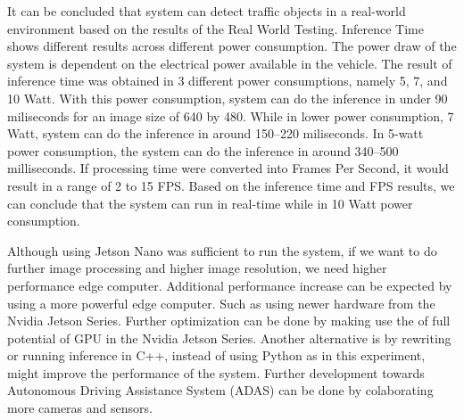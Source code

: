\documentclass[conference]{IEEEtran}
\begin{document}
It can be concluded that system can detect traffic objects in a real-world environment based on the results of the Real World Testing. Inference Time shows different results across different power consumption.
The power draw of the system is dependent on the electrical power available in the vehicle. The result of inference time was obtained in 3 different power consumptions, namely 5, 7, and 10 Watt.
With this power consumption, system can do the inference in under 90 miliseconds for an image size of 640 by 480.
While in lower power consumption, 7 Watt, system can do the inference in around 150--220 miliseconds.
In 5-watt power consumption, the system can do the inference in around 340--500 milliseconds.
If processing time were converted into Frames Per Second, it would result in a range of 2 to 15 FPS.
Based on the inference time and FPS results, we can conclude that the system can run in real-time while in 10 Watt power consumption.

Although using Jetson Nano was sufficient to run the system, if we want to do further image processing and higher image resolution, we need higher performance edge computer.
Additional performance increase can be expected by using a more powerful edge computer. Such as using newer hardware from the Nvidia Jetson Series. Further optimization can be done by making use the of full potential of GPU in the Nvidia Jetson Series. Another alternative is by rewriting or running inference in C++, instead of using Python as in this experiment, might improve the performance of the system.
Further development towards Autonomous Driving Assistance System (ADAS) can be done by colaborating more cameras and sensors.
\end{document}
